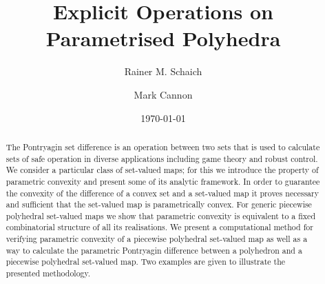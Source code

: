 \documentclass[smallextended]{svjour3}       %
\numberwithin{equation}{section}
\begin{document}
\title{Explicit Operations on Parametrised Polyhedra}%


\author{Rainer M. Schaich
\and 
Mark Cannon}



\date{\today}

\maketitle


\begin{abstract}
The Pontryagin set difference is an operation between two sets that is used to calculate sets of safe operation in diverse applications including game theory and robust control.
%
We consider a particular class of set-valued maps; for this we introduce the property of parametric convexity and present some of its analytic framework.
%
In order to guarantee the convexity of the difference of a convex set and a set-valued map it proves necessary and sufficient that the set-valued map is parametrically convex.
%
For generic piecewise polyhedral set-valued maps we show that parametric convexity is equivalent to a fixed combinatorial structure of all its realisations.
%
We present a computational method for verifying parametric convexity of a piecewise polyhedral set-valued map as well as a way to calculate the parametric Pontryagin difference between a polyhedron and a piecewise polyhedral set-valued map.
%
Two examples are given to illustrate the presented methodology.


\end{abstract}
\end{document}

